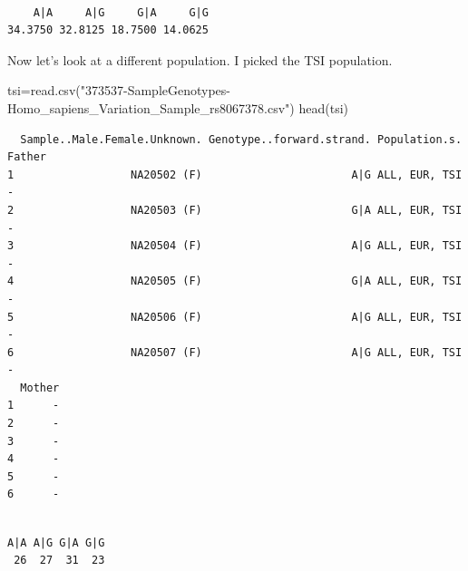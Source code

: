 \documentclass[
  letterpaper,
  DIV=11,
  numbers=noendperiod]{scrartcl}
\newenvironment{Shaded}{\begin{snugshade}}{\end{snugshade}}
\newcommand{\DecValTok}[1]{\textcolor[rgb]{0.68,0.00,0.00}{#1}}
\newcommand{\FunctionTok}[1]{\textcolor[rgb]{0.28,0.35,0.67}{#1}}
\newcommand{\NormalTok}[1]{\textcolor[rgb]{0.00,0.23,0.31}{#1}}
\newcommand{\OtherTok}[1]{\textcolor[rgb]{0.00,0.23,0.31}{#1}}
\newcommand{\SpecialCharTok}[1]{\textcolor[rgb]{0.37,0.37,0.37}{#1}}
\newcommand{\StringTok}[1]{\textcolor[rgb]{0.13,0.47,0.30}{#1}}
\begin{document}
\begin{verbatim}

    A|A     A|G     G|A     G|G 
34.3750 32.8125 18.7500 14.0625 
\end{verbatim}

Now let's look at a different population. I picked the TSI population.

\begin{Shaded}
\begin{Highlighting}[]
\NormalTok{tsi}\OtherTok{=}\FunctionTok{read.csv}\NormalTok{(}\StringTok{"373537{-}SampleGenotypes{-}Homo\_sapiens\_Variation\_Sample\_rs8067378.csv"}\NormalTok{)}
\FunctionTok{head}\NormalTok{(tsi)}
\end{Highlighting}
\end{Shaded}

\begin{verbatim}
  Sample..Male.Female.Unknown. Genotype..forward.strand. Population.s. Father
1                  NA20502 (F)                       A|G ALL, EUR, TSI      -
2                  NA20503 (F)                       G|A ALL, EUR, TSI      -
3                  NA20504 (F)                       A|G ALL, EUR, TSI      -
4                  NA20505 (F)                       G|A ALL, EUR, TSI      -
5                  NA20506 (F)                       A|G ALL, EUR, TSI      -
6                  NA20507 (F)                       A|G ALL, EUR, TSI      -
  Mother
1      -
2      -
3      -
4      -
5      -
6      -
\end{verbatim}

\begin{Shaded}
\end{Shaded}

\begin{verbatim}

A|A A|G G|A G|G 
 26  27  31  23 
\end{verbatim}

\begin{Shaded}
\end{Shaded}
\end{document}

